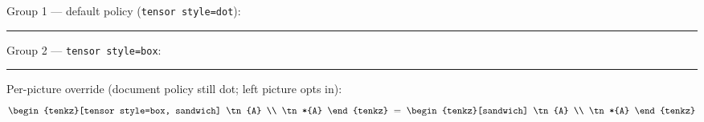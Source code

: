 \documentclass[varwidth=16cm, border=6pt]{standalone}
\begin{document}
Group 1 --- default policy (\texttt{tensor style=dot}):

\medskip


\bigskip\hrule\bigskip

Group 2 --- \texttt{tensor style=box}:

\medskip
{%
}

\bigskip\hrule\bigskip

Per-picture override (document policy still dot; left picture opts in):
\[
  \begin{tenkz}[tensor style=box, sandwich]
    \tn{A} \\
    \tn*{A}
  \end{tenkz}
  \;=\;
  \begin{tenkz}[sandwich]
    \tn{A} \\
    \tn*{A}
  \end{tenkz}
\]
\end{document}
